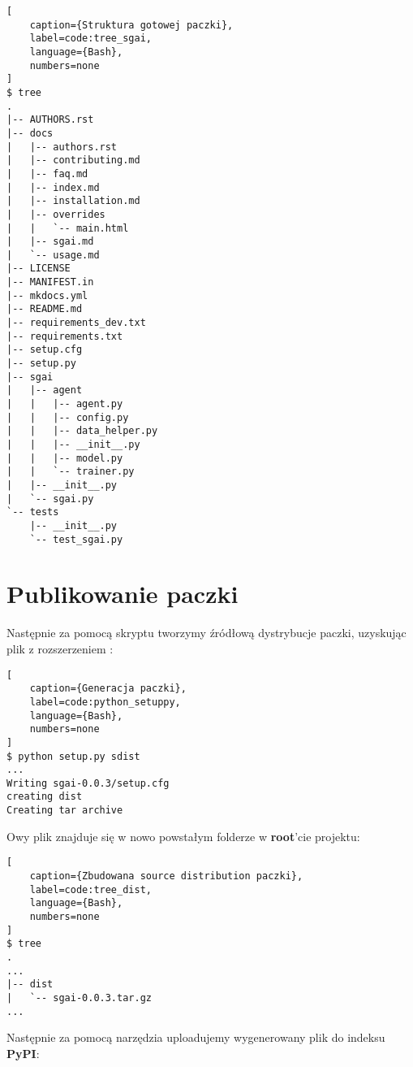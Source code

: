 \begin{onepage}
    \begin{lstlisting}[
    caption={Struktura gotowej paczki},
    label=code:tree_sgai,
    language={Bash},
    numbers=none
]
$ tree
.
|-- AUTHORS.rst
|-- docs
|   |-- authors.rst
|   |-- contributing.md
|   |-- faq.md
|   |-- index.md
|   |-- installation.md
|   |-- overrides
|   |   `-- main.html
|   |-- sgai.md
|   `-- usage.md
|-- LICENSE
|-- MANIFEST.in
|-- mkdocs.yml
|-- README.md
|-- requirements_dev.txt
|-- requirements.txt
|-- setup.cfg
|-- setup.py
|-- sgai
|   |-- agent
|   |   |-- agent.py
|   |   |-- config.py
|   |   |-- data_helper.py
|   |   |-- __init__.py
|   |   |-- model.py
|   |   `-- trainer.py
|   |-- __init__.py
|   `-- sgai.py
`-- tests
    |-- __init__.py
    `-- test_sgai.py
    \end{lstlisting}
\end{onepage}


\clearpage

\section{Publikowanie paczki}


Następnie za pomocą skryptu  tworzymy źródłową dystrybucje paczki, uzyskując plik z rozszerzeniem :

\begin{onepage}
    \begin{lstlisting}[
    caption={Generacja paczki},
    label=code:python_setuppy,
    language={Bash},
    numbers=none
]
$ python setup.py sdist
...
Writing sgai-0.0.3/setup.cfg
creating dist
Creating tar archive
    \end{lstlisting}
\end{onepage}


Owy plik znajduje się w nowo powstałym folderze  w \textbf{root}'cie projektu:

\begin{onepage}
    \begin{lstlisting}[
    caption={Zbudowana source distribution paczki},
    label=code:tree_dist,
    language={Bash},
    numbers=none
]
$ tree
.
...
|-- dist
|   `-- sgai-0.0.3.tar.gz
...
    \end{lstlisting}
\end{onepage}


Następnie za pomocą narzędzia  uploadujemy wygenerowany plik do indeksu \textbf{PyPI}:


